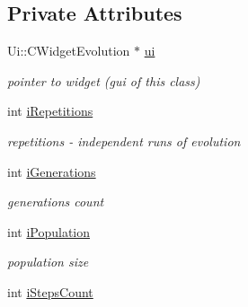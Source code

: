 \subsection*{Private Attributes}
\begin{DoxyCompactItemize}
\item 
\hypertarget{classCWidgetEvolution_a50a1f44adcae0b612d6a480fbdcc641e}{
Ui::CWidgetEvolution $\ast$ \hyperlink{classCWidgetEvolution_a50a1f44adcae0b612d6a480fbdcc641e}{ui}}
\label{classCWidgetEvolution_a50a1f44adcae0b612d6a480fbdcc641e}

\begin{DoxyCompactList}\small\item\em pointer to widget (gui of this class) \item\end{DoxyCompactList}\item 
\hypertarget{classCWidgetEvolution_a8a56a1fa6b4cb1f1bd5a6f00ba7b7144}{
int \hyperlink{classCWidgetEvolution_a8a56a1fa6b4cb1f1bd5a6f00ba7b7144}{iRepetitions}}
\label{classCWidgetEvolution_a8a56a1fa6b4cb1f1bd5a6f00ba7b7144}

\begin{DoxyCompactList}\small\item\em repetitions -\/ independent runs of evolution \item\end{DoxyCompactList}\item 
\hypertarget{classCWidgetEvolution_a3246b8532969c19fcab09253833f1726}{
int \hyperlink{classCWidgetEvolution_a3246b8532969c19fcab09253833f1726}{iGenerations}}
\label{classCWidgetEvolution_a3246b8532969c19fcab09253833f1726}

\begin{DoxyCompactList}\small\item\em generations count \item\end{DoxyCompactList}\item 
\hypertarget{classCWidgetEvolution_a9e80d3139c0034444c6c922fc1f5f4f6}{
int \hyperlink{classCWidgetEvolution_a9e80d3139c0034444c6c922fc1f5f4f6}{iPopulation}}
\label{classCWidgetEvolution_a9e80d3139c0034444c6c922fc1f5f4f6}

\begin{DoxyCompactList}\small\item\em population size \item\end{DoxyCompactList}\item 
\hypertarget{classCWidgetEvolution_a41eb68a4be2a3166d9b03e3a55947fe3}{
int \hyperlink{classCWidgetEvolution_a41eb68a4be2a3166d9b03e3a55947fe3}{iStepsCount}}
\label{classCWidgetEvolution_a41eb68a4be2a3166d9b03e3a55947fe3}


\end{DoxyCompactItemize}
